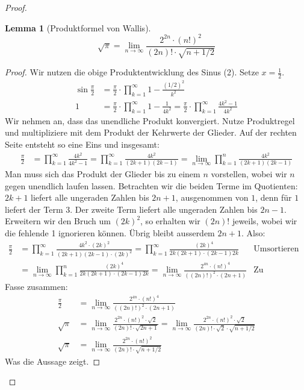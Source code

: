 \documentclass[10pt,fleqn]{article}
\theoremstyle{definition}
\newtheorem{lemma}{Lemma}
\theoremstyle{remark}
\begin{document}
\begin{proof}
    \begin{lemma}[Produktformel von Wallis]
        \[
            \sqrt{\pi} = \lim_{n\to\infty} \frac{2^{2n}\cdot(n!)^2}{(2n)!\cdot\sqrt{n+1/2}}
        \]
    \end{lemma}

    \begin{proof} Wir nutzen die obige Produktentwicklung des Sinus (2). Setze \(x = \frac{1}{2}\).
        \begin{align*}
            \sin{\frac{\pi}{2}} &= \frac{\pi}{2} \cdot \prod_{k=1}^{\infty} 1 - \frac{(1/2)^2}{k^2}\\
            1 &= \frac{\pi}{2} \cdot \prod_{k=1}^{\infty} 1 - \frac{1}{4k^2} = \frac{\pi}{2} \cdot \prod_{k=1}^{\infty} \frac{4k^2-1}{4k^2}
        \end{align*}
        Wir nehmen an, dass das unendliche Produkt konvergiert. Nutze Produktregel und multipliziere mit dem Produkt der Kehrwerte der Glieder. Auf der rechten Seite entsteht so eine Eins und insgesamt:
        \begin{align*}
            \frac{\pi}{2} &= \prod_{k=1}^{\infty} \frac{4k^2}{4k^2-1} = \prod_{k=1}^{\infty} \frac{4k^2}{(2k+1)(2k-1)} = \lim_{n\to\infty}\prod_{k=1}^n \frac{4k^2}{(2k+1)(2k-1)}
        \end{align*}
        Man muss sich das Produkt der Glieder bis zu einem \(n\) vorstellen, wobei wir \(n\) gegen unendlich laufen lassen.
        Betrachten wir die beiden Terme im Quotienten: \(2k+1\) liefert alle ungeraden Zahlen bis \(2n+1\), ausgenommen von \(1\), denn für \(1\) liefert der Term \(3\). Der zweite Term liefert alle ungeraden Zahlen bis \(2n-1\). Erweitern wir den Bruch um \((2k)^2\), so erhalten wir \((2n)!\) jeweils, wobei wir die fehlende 1 ignorieren können. Übrig bleibt ausserdem \(2n+1\). Also:
        \begin{align*}
            \frac{\pi}{2} &= \prod_{k=1}^{\infty} \frac{4k^2 \cdot (2k)^2}{(2k+1)(2k-1) \cdot (2k)^2} = \prod_{k=1}^{\infty} \frac{(2k)^4}{2k(2k+1) \cdot (2k-1)2k} & \text{Umsortieren}\\
            &= \lim_{n\to\infty}\prod_{k=1}^n \frac{(2k)^4}{2k(2k+1) \cdot (2k-1)2k} = \lim_{n\to\infty} \frac{2^{4n}\cdot(n!)^4}{((2n)!)^2 \cdot (2n+1)} & \text{Zu Grenzwerten umformulieren}
        \end{align*}
        Fasse zusammen:
        \begin{align*}
            \frac{\pi}{2} &= \lim_{n\to\infty} \frac{2^{4n}\cdot(n!)^4}{((2n)!)^2 \cdot (2n+1)}\\
            \sqrt{\pi} &= \lim_{n\to\infty} \frac{2^{2n}\cdot(n!)^2\cdot\sqrt{2}}{(2n)! \cdot \sqrt{2n+1}} = \lim_{n\to\infty} \frac{2^{2n}\cdot(n!)^2\cdot\sqrt{2}}{(2n)! \cdot \sqrt{2} \cdot \sqrt{n+1/2}}\\
            \sqrt{\pi} &= \lim_{n\to\infty} \frac{2^{2n}\cdot(n!)^2}{(2n)! \cdot \sqrt{n+1/2}}
        \end{align*}
        Was die Aussage zeigt.
    \end{proof}


\end{proof}
\end{document}
